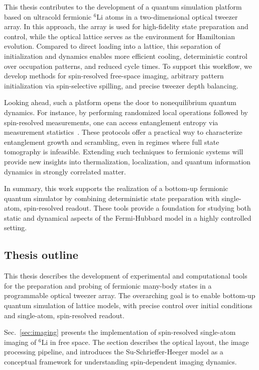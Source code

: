 This thesis contributes to the development of a quantum simulation platform based on ultracold fermionic $^6$Li atoms in a two-dimensional optical tweezer array. In this approach, the array is used for high-fidelity state preparation and control, while the optical lattice serves as the environment for Hamiltonian evolution. Compared to direct loading into a lattice, this separation of initialization and dynamics enables more efficient cooling, deterministic control over occupation patterns, and reduced cycle times. To support this workflow, we develop methods for spin-resolved free-space imaging, arbitrary pattern initialization via spin-selective spilling, and precise tweezer depth balancing.

Looking ahead, such a platform opens the door to nonequilibrium quantum dynamics. For instance, by performing randomized local operations followed by spin-resolved measurements, one can access entanglement entropy via measurement statistics~\cite{brydges_probing_2019}. These protocols offer a practical way to characterize entanglement growth and scrambling, even in regimes where full state tomography is infeasible. Extending such techniques to fermionic systems will provide new insights into thermalization, localization, and quantum information dynamics in strongly correlated matter.

In summary, this work supports the realization of a bottom-up fermionic quantum simulator by combining deterministic state preparation with single-atom, spin-resolved readout. These tools provide a foundation for studying both static and dynamical aspects of the Fermi-Hubbard model in a highly controlled setting.


\subsection{Thesis outline}

This thesis describes the development of experimental and computational tools for the preparation and probing of fermionic many-body states in a programmable optical tweezer array. The overarching goal is to enable bottom-up quantum simulation of lattice models, with precise control over initial conditions and single-atom, spin-resolved readout.

Sec.~\ref{sec:imaging} presents the implementation of spin-resolved single-atom imaging of $^6$Li in free space. The section describes the optical layout, the image processing pipeline, and introduces the Su-Schrieffer-Heeger model as a conceptual framework for understanding spin-dependent imaging dynamics.

